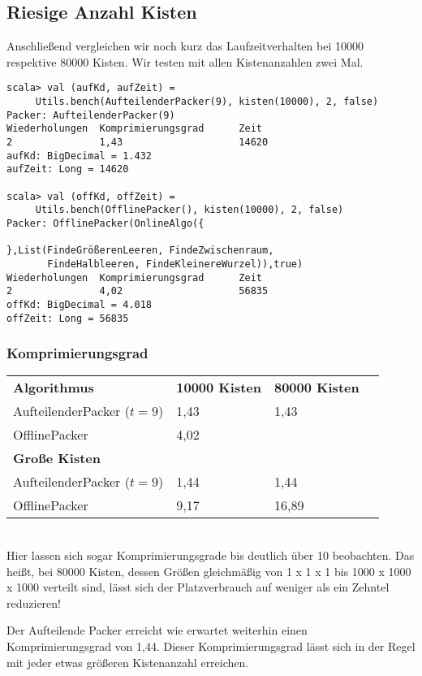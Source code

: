 \subsection{Riesige Anzahl Kisten}
Anschließend vergleichen wir noch kurz das Laufzeitverhalten bei 10000 respektive 80000 Kisten.
Wir testen mit allen Kistenanzahlen zwei Mal.
\begin{lstlisting}
scala> val (aufKd, aufZeit) =
	 Utils.bench(AufteilenderPacker(9), kisten(10000), 2, false) 
Packer: AufteilenderPacker(9)
Wiederholungen  Komprimierungsgrad      Zeit
2               1,43                    14620
aufKd: BigDecimal = 1.432
aufZeit: Long = 14620

scala> val (offKd, offZeit) =
	 Utils.bench(OfflinePacker(), kisten(10000), 2, false) 
Packer: OfflinePacker(OnlineAlgo({

},List(FindeGrößerenLeeren, FindeZwischenraum,
       FindeHalbleeren, FindeKleinereWurzel)),true)
Wiederholungen  Komprimierungsgrad      Zeit
2               4,02                    56835
offKd: BigDecimal = 4.018
offZeit: Long = 56835
\end{lstlisting}

\subsubsection*{Komprimierungsgrad}
\begin{tabular}{llll}
\textbf{Algorithmus} 	& \textbf{10000 Kisten} & \textbf{80000 Kisten} \\
 AufteilenderPacker ($t=9$)  	& 1,43		& 1,43			\\
 OfflinePacker			& 4,02		& 			\vspace*{.48em} \\
\textbf{Große Kisten} & & \\
 AufteilenderPacker ($t=9$)  	& 1,44		& 1,44			\\
 OfflinePacker			& 9,17		& 16,89			\\
\end{tabular}\\

 Hier lassen sich sogar Komprimierungsgrade bis deutlich über 10 beobachten.
 Das heißt, bei 80000 Kisten, dessen Größen gleichmäßig von 1 x 1 x 1 bis 1000 x 1000 x 1000 verteilt sind,
  lässt sich der Platzverbrauch auf weniger als ein Zehntel reduzieren!

 Der Aufteilende Packer erreicht wie erwartet weiterhin einen Komprimierungsgrad von 1,44.
 Dieser Komprimierungsgrad lässt sich in der Regel mit jeder etwas größeren Kistenanzahl erreichen.
 
